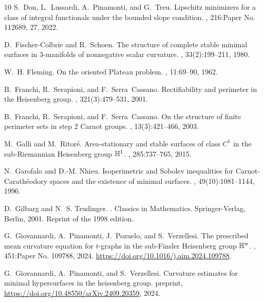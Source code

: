 \documentclass[11pt]{amsart}
\theoremstyle{definition}
\theoremstyle{remark}
\numberwithin{equation}{section}
\begin{document}
\begin{thebibliography}{10}
S.~Don, L.~Lussardi, A.~Pinamonti, and G.~Treu.
\newblock Lipschitz minimizers for a class of integral functionals under the bounded slope condition.
, 216:Paper No. 112689, 27, 2022.

D.~Fischer-Colbrie and R.~Schoen.
\newblock The structure of complete stable minimal surfaces in {$3$}-manifolds of nonnegative scalar curvature.
, 33(2):199--211, 1980.

W.~H. Fleming.
\newblock On the oriented {P}lateau problem.
, 11:69--90, 1962.

B.~Franchi, R.~Serapioni, and F.~Serra~Cassano.
\newblock Rectifiability and perimeter in the {H}eisenberg group.
, 321(3):479--531, 2001.

B.~Franchi, R.~Serapioni, and F.~Serra~Cassano.
\newblock On the structure of finite perimeter sets in step 2 {C}arnot groups.
, 13(3):421--466, 2003.

M.~Galli and M.~Ritor\'{e}.
\newblock Area-stationary and stable surfaces of class {$C^1$} in the sub-{R}iemannian {H}eisenberg group {$\Bbb{H}^1$}.
, 285:737--765, 2015.

N.~Garofalo and D.-M. Nhieu.
\newblock Isoperimetric and {S}obolev inequalities for {C}arnot-{C}arath\'{e}odory spaces and the existence of minimal surfaces.
, 49(10):1081--1144, 1996.

D.~Gilbarg and N.~S. Trudinger.
.
\newblock Classics in Mathematics. Springer-Verlag, Berlin, 2001.
\newblock Reprint of the 1998 edition.

G.~Giovannardi, A.~Pinamonti, J.~Pozuelo, and S.~Verzellesi.
\newblock The prescribed mean curvature equation for {$t$}-graphs in the sub-{F}insler {H}eisenberg group {$\Bbb{H}^n$}.
, 451:Paper No. 109788, 2024.
\newblock \url{https://doi.org/10.1016/j.aim.2024.109788}.

G.~Giovannardi, A.~Pinamonti, and S.~Verzellesi.
\newblock Curvature estimates for minimal hypersurfaces in the heisenberg group.
\newblock preprint, \url{https://doi.org/10.48550/arXiv.2409.20359}, 2024.


\end{thebibliography}
\end{document}

